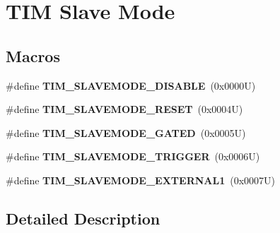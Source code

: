\hypertarget{group___t_i_m___slave___mode}{}\section{T\+IM Slave Mode}
\label{group___t_i_m___slave___mode}
\subsection*{Macros}
\begin{DoxyCompactItemize}
\item 
\mbox{\label{group___t_i_m___slave___mode_ga3b53e1a85d08f125df4371f86bdaf79b}} 
\#define {\bfseries T\+I\+M\+\_\+\+S\+L\+A\+V\+E\+M\+O\+D\+E\+\_\+\+D\+I\+S\+A\+B\+LE}~(0x0000\+U)
\item 
\mbox{\label{group___t_i_m___slave___mode_ga9f28e350c0560dc550f5c0d2f8b39ba7}} 
\#define {\bfseries T\+I\+M\+\_\+\+S\+L\+A\+V\+E\+M\+O\+D\+E\+\_\+\+R\+E\+S\+ET}~(0x0004\+U)
\item 
\mbox{\label{group___t_i_m___slave___mode_ga4501317fcd7649e5ff46db6fe69938e0}} 
\#define {\bfseries T\+I\+M\+\_\+\+S\+L\+A\+V\+E\+M\+O\+D\+E\+\_\+\+G\+A\+T\+ED}~(0x0005\+U)
\item 
\mbox{\label{group___t_i_m___slave___mode_ga12f8f7b4a16b438f54cf811f0bb0a8a4}} 
\#define {\bfseries T\+I\+M\+\_\+\+S\+L\+A\+V\+E\+M\+O\+D\+E\+\_\+\+T\+R\+I\+G\+G\+ER}~(0x0006\+U)
\item 
\mbox{\label{group___t_i_m___slave___mode_ga90dcf32a66dcb250b18da2ff56471328}} 
\#define {\bfseries T\+I\+M\+\_\+\+S\+L\+A\+V\+E\+M\+O\+D\+E\+\_\+\+E\+X\+T\+E\+R\+N\+A\+L1}~(0x0007\+U)
\end{DoxyCompactItemize}


\subsection{Detailed Description}
